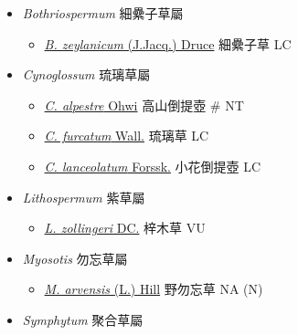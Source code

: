 
  \begin{itemize}
 \item[] \textit{Bothriospermum} 細纍子草屬
                                
  \begin{itemize}
        \item[] \href{http://www.theplantlist.org/tpl1.1/search?q=Bothriospermum+zeylanicum}{\textit{B. zeylanicum} (J.Jacq.) Druce}   細纍子草   LC
  \end{itemize}
 \item[] \textit{Cynoglossum} 琉璃草屬
                                
  \begin{itemize}
        \item[] \href{http://www.theplantlist.org/tpl1.1/search?q=Cynoglossum+alpestre}{\textit{C. alpestre} Ohwi}   高山倒提壺  \# NT
        \item[] \href{http://www.theplantlist.org/tpl1.1/search?q=Cynoglossum+furcatum}{\textit{C. furcatum} Wall.}   琉璃草   LC
        \item[] \href{http://www.theplantlist.org/tpl1.1/search?q=Cynoglossum+lanceolatum}{\textit{C. lanceolatum} Forssk.}   小花倒提壺   LC
  \end{itemize}
 \item[] \textit{Lithospermum} 紫草屬
                                
  \begin{itemize}
        \item[] \href{http://www.theplantlist.org/tpl1.1/search?q=Lithospermum+zollingeri}{\textit{L. zollingeri} DC.}   梓木草   VU
  \end{itemize}
 \item[] \textit{Myosotis} 勿忘草屬
                                
  \begin{itemize}
        \item[] \href{http://www.theplantlist.org/tpl1.1/search?q=Myosotis+arvensis}{\textit{M. arvensis} (L.) Hill}   野勿忘草   NA (N)
  \end{itemize}
 \item[] \textit{Symphytum} 聚合草屬
                                

\end{itemize}
